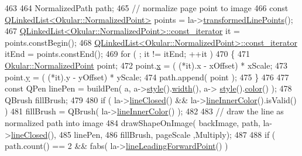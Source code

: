 \begin{DoxyCode}
463 
464                     NormalizedPath path;
465                     \textcolor{comment}{// normalize page point to image}
466                     \textcolor{keyword}{const} \hyperlink{classQLinkedList}{QLinkedList<Okular::NormalizedPoint>} points =
       la->\hyperlink{classOkular_1_1LineAnnotation_a1e3b104d9572967e66f35a15c335f37c}{transformedLinePoints}();
467                     \hyperlink{classQLinkedList}{QLinkedList<Okular::NormalizedPoint>::const\_iterator}
       it = points.constBegin();
468                     \hyperlink{classQLinkedList}{QLinkedList<Okular::NormalizedPoint>::const\_iterator}
       itEnd = points.constEnd();
469                     \textcolor{keywordflow}{for} ( ; it != itEnd; ++it )
470                     \{
471                         \hyperlink{classOkular_1_1NormalizedPoint}{Okular::NormalizedPoint} point;
472                         point.\hyperlink{classOkular_1_1NormalizedPoint_a857f49b9bc7712430d167472ef9dbd94}{x} = ( (*it).x - xOffset) * xScale;
473                         point.\hyperlink{classOkular_1_1NormalizedPoint_ac2276daabda627d5f82bb1532c293047}{y} = ( (*it).y - yOffset) * yScale;
474                         path.append( point );
475                     \}
476 
477                     \textcolor{keyword}{const} QPen linePen = buildPen( a, a->\hyperlink{classOkular_1_1Annotation_ae1f845ddbd6d524b2b388c6c9ef26423}{style}().\hyperlink{classOkular_1_1Annotation_1_1Style_a5a8e23f3a4f95e25f45770937dc82948}{width}(), a->
      \hyperlink{classOkular_1_1Annotation_ae1f845ddbd6d524b2b388c6c9ef26423}{style}().\hyperlink{classOkular_1_1Annotation_1_1Style_a2c32cb2b41ef8732ddcd3d3dffc20b7d}{color}() );
478                     QBrush fillBrush;
479 
480                     \textcolor{keywordflow}{if} ( la->\hyperlink{classOkular_1_1LineAnnotation_a5d2d587e08762b48ded428be2e390e79}{lineClosed}() && la->\hyperlink{classOkular_1_1LineAnnotation_a240bcd7154afdf61c526295134abdc0f}{lineInnerColor}().isValid() )
481                         fillBrush = QBrush( la->\hyperlink{classOkular_1_1LineAnnotation_a240bcd7154afdf61c526295134abdc0f}{lineInnerColor}() );
482 
483                     \textcolor{comment}{// draw the line as normalized path into image}
484                     drawShapeOnImage( backImage, path, la->\hyperlink{classOkular_1_1LineAnnotation_a5d2d587e08762b48ded428be2e390e79}{lineClosed}(),
485                                       linePen,
486                                       fillBrush, pageScale ,Multiply);
487 
488                     \textcolor{keywordflow}{if} ( path.count() == 2 && fabs( la->\hyperlink{classOkular_1_1LineAnnotation_a5ea35b2ee68172d9cf183d8778e34edb}{lineLeadingForwardPoint}() ) 

\end{DoxyCode}
